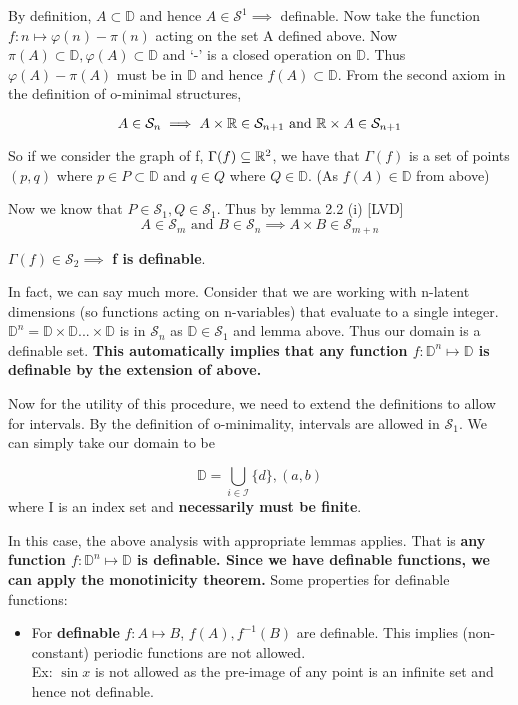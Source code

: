 \begin{definition}
By definition, $A\subset\mathbb{D}$ and hence $A\in\mathcal{S}^1 \implies $ definable.
Now take the function $f: n\mapsto\varphi(n) - \pi(n)$ acting on the set A defined above. Now $\pi(A)\subset\mathbb{D}, \varphi(A)\subset\mathbb{D}$ and `-' is a closed operation on $\mathbb{D}$. Thus $\varphi(A) - \pi(A)$ must be in $\mathbb{D}$ and hence $f(A)\subset\mathbb{D}$.
From the second axiom in the definition of o-minimal structures,

\begin{equation*}
    A \in \mathcal{S}_n\implies A \times\mathbb{R}\in\mathcal{S}_{n+1} \text{ and } \mathbb{R} \times A\in\mathcal{S}_{n+1}
\end{equation*}

So if we consider the graph of f, $\Gamma(f)\subseteq\mathbb{R}^2$, we have that $\Gamma(f)$ is a set of points $(p,q)$ where $p\in P\subset\mathbb{D}$ and $q\in Q$ where $Q\in\mathbb{D}$. (As $f(A)\in\mathbb{D}$ from above)

Now we know that $P\in\mathcal{S}_1, Q\in\mathcal{S}_1$. Thus by lemma 2.2 (i) [LVD]
\begin{equation*}
    A\in\mathcal{S}_m \text{ and } B\in\mathcal{S}_n \implies A\times B\in\mathcal{S}_{m+n}
\end{equation*}

$\Gamma(f)\in\mathcal{S}_2\implies$ \textbf{f is definable}.

In fact, we can say much more. Consider that we are working with n-latent dimensions (so functions acting on n-variables) that evaluate to a single integer. $\mathbb{D}^n = \mathbb{D}\times\mathbb{D}...\times\mathbb{D}$ is in $\mathcal{S}_n$ as $\mathbb{D}\in\mathcal{S}_1$ and lemma above. Thus our domain is a definable set. 
\textbf{This automatically implies that any function $f:\mathbb{D}^n\mapsto\mathbb{D}$ is definable by the extension of above.}

Now for the utility of this procedure, we need to extend the definitions to allow for intervals. By the definition of o-minimality, intervals are allowed in $\mathcal{S}_1$. We can simply take our domain to be

\begin{equation*}
    \mathbb{D} = \bigcup_{i\in\mathcal{I}} \{d\}, (a,b)
\end{equation*}
where I is an index set and \textbf{necessarily must be finite}.

In this case, the above analysis with appropriate lemmas applies. That is \textbf{any function $f:\mathbb{D}^n\mapsto\mathbb{D}$ is definable. Since we have definable functions, we can apply the monotinicity theorem.}
Some properties for definable functions:
\begin{itemize}
    \item For \textbf{ definable } $f:A\mapsto B$, $f(A), f^{-1}(B)$ are definable. This implies (non-constant) periodic functions are not allowed.
    \\
    Ex: $\sin{x}$ is not allowed as the pre-image of any point is an infinite set and hence not definable.
\end{itemize}


\end{definition}
